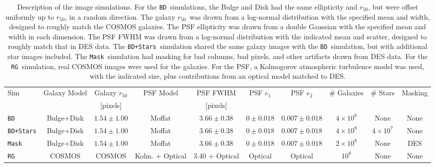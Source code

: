 \documentclass[usegraphicx,usenatbib]{mn2e}
\newcommand{\hlr}{$r_{50}$}
\newcommand{\nsimNgal}{$10^8$}
\newcommand{\nsimNgalTwo}{$2 \times 10^8$}
\newcommand{\nsimNgalFour}{$4 \times 10^8$}
\newcommand{\nsimNStar}{$4 \times 10^7$}
\newcommand{\psfeonedist}{$0 \pm 0.018$}
\newcommand{\psfetwodist}{$0.007 \pm 0.018$}
\newcommand{\psfrdist}{$3.66 \pm 0.38$}
\newcommand{\galrdist}{$1.54 \pm 1.00$}
\newcommand{\cosmosname}{COSMOS}
\newcommand{\bdsim}{\texttt{BD}}
\newcommand{\bdstar}{\texttt{BD+Stars}}
\newcommand{\bdmask}{\texttt{Mask}}
\newcommand{\rgsim}{\texttt{RG}}
\begin{document}
\begin{table}
    \centering
    \caption{Description of the image simulations.  For the \bdsim\ simulations,
        the Bulge and Disk had the same ellipticity and \hlr, but were offset
        uniformly up to \hlr, in a random direction.  The galaxy \hlr\ was drawn
        from a log-normal distribution with the specified mean and width, designed
        to roughly match the COSMOS galaxies.  The PSF ellipticity was
        drawn from a double Gaussian with the specified mean and width in each
        dimension.  The PSF FWHM was drawn from a log-normal distribution with
        the indicated mean and scatter, designed to roughly match
        that in DES data.  The \bdstar\ simulation shared the
        same galaxy images with the \bdsim\ simulation, but with additional star
        images included.  The \bdmask\ simulation had masking for bad columns,
        bad pixels, and other artifacts drawn from DES data. For the \rgsim\
        simulation, real COSMOS images were used for the galaxies. For
        the PSF, a  Kolmogorov atmospheric turbulence model was used,
        with the indicated size,
        plus contributions from an optical model matched to DES. \label{tab:sims}}
    \begin{tabular}{ | l | c | c | c | c | c | c | c | c | c |}
        Sim          & Galaxy Model & Galaxy \hlr & PSF Model       & PSF FWHM        & PSF $e_1$    & PSF $e_2$   & \# Galaxies    & \# Stars   & Masking   \\
                     &              & [pixels]    &                 & [pixels]        &              &             &                &            &  \\
        \hline
        \bdsim       & Bulge+Disk   & \galrdist   & Moffat          & \psfrdist       & \psfeonedist &\psfetwodist &  \nsimNgalFour & None       & None      \\
        \bdstar      & Bulge+Disk   & \galrdist   & Moffat          & \psfrdist       & \psfeonedist &\psfetwodist &  \nsimNgalFour & \nsimNStar & None      \\
        \bdmask      & Bulge+Disk   & \galrdist   & Moffat          & \psfrdist       & \psfeonedist &\psfetwodist &  \nsimNgalTwo  & None       & DES      \\
        \rgsim       & \cosmosname  & \cosmosname & Kolm. + Optical & 3.40 + Optical  & Optical      & Optical     &  \nsimNgal     & None       & None      \\
    \end{tabular}
\end{table}
\end{document}
